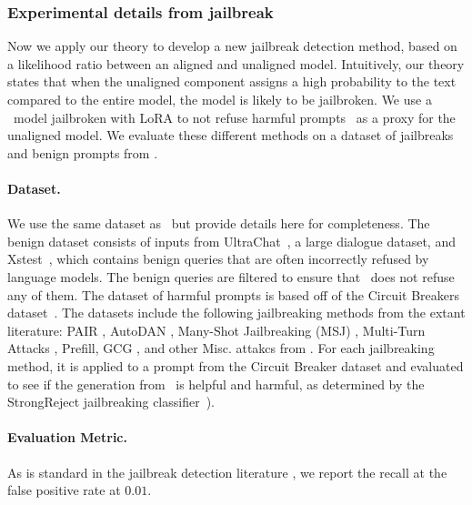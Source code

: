 \subsubsection{Experimental details from jailbreak}\label{app:jailbreak_dataset}
Now we apply our theory to develop a new jailbreak detection method, based on a likelihood ratio between an aligned and unaligned model. Intuitively, our theory states that when the unaligned component assigns a high probability to the text compared to the entire model, the model is likely to be jailbroken. We use a \llamainstruct~model jailbroken with LoRA to not refuse harmful prompts~\citep{llama_jailbroken} as a proxy for the unaligned model. We evaluate these different methods on a dataset of jailbreaks and benign prompts from \citep{bailey2024obfuscatedactivationsbypassllm}. 

\paragraph{Dataset.} We use the same dataset as~\citep{bailey2024obfuscatedactivationsbypassllm} but provide details here for completeness. The benign dataset consists of inputs from UltraChat~\citep{ding2023enhancingchatlanguagemodels}, a large dialogue dataset, and Xstest~\citep{rottger2024xstesttestsuiteidentifying}, which contains benign queries that are often incorrectly refused by language models. The benign queries are filtered to ensure that \llamainstruct~does not refuse any of them. The dataset of harmful prompts is based off of the Circuit Breakers dataset~\citep{zou2024improvingalignmentrobustnesscircuit}.  The datasets include the following jailbreaking methods from the extant literature: PAIR \citep{chao2023jailbreaking}, AutoDAN \citep{liu2024autodan}, Many-Shot Jailbreaking (MSJ) \citep{anil2024manyshot}, 
Multi-Turn Attacks \citep{li2024llmdefensesrobustmultiturn,haize2024mt}, Prefill, GCG \citep{zou2023universaltransferableadversarialattacks}, and other Misc. attakcs from \citep{wei2023jailbrokendoesllmsafety}.  For each jailbreaking method, it is applied to a prompt from the Circuit Breaker dataset and evaluated to see if the generation from \llamainstruct~is helpful and harmful, as determined by the StrongReject jailbreaking classifier~\citep{souly2024strongrejectjailbreaks}).

\paragraph{Evaluation Metric.} As is standard in the jailbreak detection literature \citep{bailey2024obfuscatedactivationsbypassllm}, we report the recall at the false positive rate at $0.01$. 


